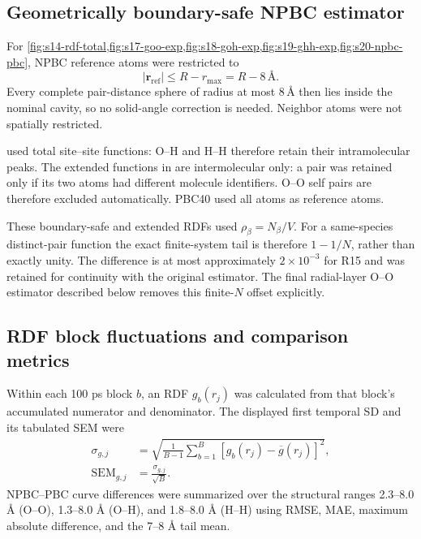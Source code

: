 \documentclass[11pt]{article}
\newcommand{\angstrom}{\text{\AA}}
\begin{document}
\subsection{Geometrically boundary-safe NPBC estimator}

For \cref{fig:s14-rdf-total,fig:s17-goo-exp,fig:s18-goh-exp,fig:s19-ghh-exp,fig:s20-npbc-pbc},
NPBC reference atoms were restricted
to
\begin{equation}
 |\bm r_{\mathrm{ref}}|\leq R-r_{\max}=R-8\,\angstrom.
 \label{eq:boundary-safe}
\end{equation}
Every complete pair-distance sphere of radius at most \(8\,\angstrom\) then
lies inside the nominal cavity, so no solid-angle correction is needed.
Neighbor atoms were not spatially restricted.

 used total site--site functions: O--H and H--H
therefore retain their intramolecular peaks.  The extended functions in
 are intermolecular only: a pair was retained only
if its two atoms had different molecule identifiers.  O--O self pairs are
therefore excluded automatically.  PBC40 used all atoms as reference atoms.

These boundary-safe and extended RDFs used \(\rho_\beta=N_\beta/V\).  For a
same-species distinct-pair function the exact finite-system tail is therefore
\(1-1/N\), rather than exactly unity.  The difference is at most
approximately \(2\times10^{-3}\) for R15 and was retained for continuity with
the original estimator.  The final radial-layer O--O estimator described
below removes this finite-\(N\) offset explicitly.

\subsection{RDF block fluctuations and comparison metrics}

Within each 100 ps block \(b\), an RDF \(g_b(r_j)\) was calculated from that
block's accumulated numerator and denominator.  The displayed first temporal
SD and its tabulated SEM were
\begin{align}
 \sigma_{g,j}&=\sqrt{\frac{1}{B-1}\sum_{b=1}^{B}
 [g_b(r_j)-\overline g(r_j)]^2},\\
 \mathrm{SEM}_{g,j}&=\frac{\sigma_{g,j}}{\sqrt B}.
 \label{eq:rdf-blocks}
\end{align}
NPBC--PBC curve differences were summarized over the structural ranges
2.3--8.0 \(\angstrom\) (O--O), 1.3--8.0 \(\angstrom\) (O--H), and
1.8--8.0 \(\angstrom\) (H--H) using RMSE, MAE, maximum absolute difference,
and the 7--8 \(\angstrom\) tail mean.
\end{document}
